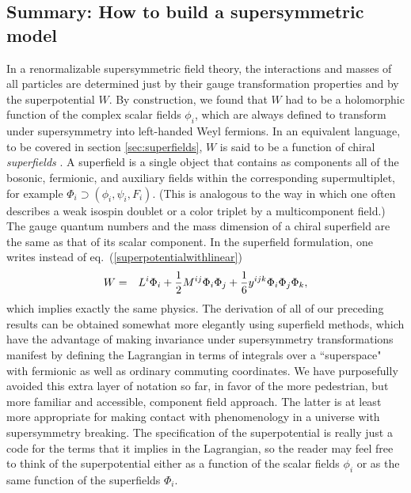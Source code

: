 \documentclass[12pt]{article}
\renewcommand{\theequation}{\arabic{section}.\arabic{equation}}
\def\beq{\begin{eqnarray}}
\def\eeq{\end{eqnarray}}
\begin{document}
\subsection{Summary: How to build a supersymmetric
model}\label{subsec:susylagr.summary}
\setcounter{footnote}{1}
\renewcommand{\theequation}{\arabic{section}.\arabic{subsection}.\arabic{equation}}
\setcounter{equation}{0}

In a renormalizable supersymmetric field theory, the interactions and
masses of all particles are determined just by their gauge transformation
properties and by the superpotential $W$. By construction, we found that
$W$ had to be a holomorphic function of the complex scalar fields $\phi_i$,
which are always defined to transform under supersymmetry into left-handed
Weyl fermions. In an equivalent language, to be covered 
in section \ref{sec:superfields}, $W$ is
said to be a function of chiral {\it superfields} \cite{superfields}. A
superfield is a single object that contains as components all of the
bosonic, fermionic, and auxiliary fields within the corresponding
supermultiplet, for example $\Phi_i \supset (\phi_i,\psi_i,F_i)$. (This is
analogous to the way in which one often describes a weak isospin doublet
or a color triplet by a multicomponent field.) The gauge quantum numbers and
the mass dimension of a chiral superfield are the same as that of its
scalar component. In the superfield formulation, one writes instead of
eq.~(\ref{superpotentialwithlinear})
\beq
W &=& 
L^i \Phi_i +
{1\over 2}M^{ij} \Phi_i\Phi_j +{1\over 6} y^{ijk} \Phi_i \Phi_j \Phi_k 
,
\label{superpot}
\eeq
which implies exactly the same physics. The derivation of all of our
preceding results can be obtained somewhat more elegantly using superfield
methods, which have the advantage of making invariance under supersymmetry
transformations manifest by defining the Lagrangian in terms of integrals
over a ``superspace" with fermionic as well as ordinary commuting
coordinates. We have purposefully avoided this extra layer of notation so far, in
favor of the more pedestrian, but more familiar and accessible, component
field approach. The latter is at least more appropriate for making contact
with phenomenology in a universe with supersymmetry breaking.  
The specification of the superpotential
is really just a code for the terms that it implies in the Lagrangian, so the
reader may feel free to think of the superpotential either as a function
of the scalar fields $\phi_i$ or as the same function of the superfields
$\Phi_i$. 
\end{document}
